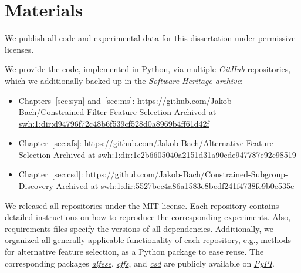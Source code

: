 \section{Materials}
\label{sec:introduction:materials}

We publish all code and experimental data for this dissertation under permissive licenses.

We provide the code, implemented in Python, via multiple \href{https://github.com/}{\emph{GitHub}} repositories, which we additionally backed up in the \href{https://archive.softwareheritage.org/}{\emph{Software Heritage archive}}:
%
\begin{itemize}
	\item Chapters~\ref{sec:syn} and~\ref{sec:ms}: \url{https://github.com/Jakob-Bach/Constrained-Filter-Feature-Selection} \newline
	Archived at \href{https://archive.softwareheritage.org/swh:1:dir:d94796f72c48b6f539cf528d0a8969b4ff61d42f;origin=https://github.com/Jakob-Bach/Constrained-Filter-Feature-Selection;visit=swh:1:snp:b9f0471bf7c5d1ee48572d687628ed14c786f901;anchor=swh:1:rev:77e893f8a6e42df004c999d009c2a02c8cdd9c5d}{swh:1:dir:d94796f72c48b6f539cf528d0a8969b4ff61d42f}
	\item Chapter~\ref{sec:afs}: \url{https://github.com/Jakob-Bach/Alternative-Feature-Selection} \newline
	Archived at \href{https://archive.softwareheritage.org/swh:1:dir:1e2b6605040a2151d31a90cde947787e92c98519;origin=https://github.com/Jakob-Bach/Alternative-Feature-Selection;visit=swh:1:snp:1413d85e1a9005d5681ee7dbeae0b4df851780de;anchor=swh:1:rev:14dea32227848c06b1430b6371e100f3d8c74010}{swh:1:dir:1e2b6605040a2151d31a90cde947787e92c98519}
	\item Chapter~\ref{sec:csd}: \url{https://github.com/Jakob-Bach/Constrained-Subgroup-Discovery} \newline
	Archived at \href{https://archive.softwareheritage.org/swh:1:dir:5527bcc4a86a1583e8bedf241f4738fc9b0e535c;origin=https://github.com/Jakob-Bach/Constrained-Subgroup-Discovery;visit=swh:1:snp:8f87dcdf0277985d373245e5a23a128efc861153;anchor=swh:1:rev:0c0e4a978c95d881c4c20eecdd5a1ae12ee08ac3}{swh:1:dir:5527bcc4a86a1583e8bedf241f4738fc9b0e535c}
\end{itemize}
%
We released all repositories under the \href{https://opensource.org/license/MIT}{MIT license}.
Each repository contains detailed instructions on how to reproduce the corresponding experiments.
Also, requirements files specify the versions of all dependencies.
Additionally, we organized all generally applicable functionality of each repository, e.g., methods for alternative feature selection, as a Python package to ease reuse.
The corresponding packages \href{https://pypi.org/project/alfese/}{\emph{alfese}}, \href{https://pypi.org/project/cffs/}{\emph{cffs}}, and \href{https://pypi.org/project/csd/}{\emph{csd}} are publicly available on \href{https://pypi.org}{\emph{PyPI}}.


